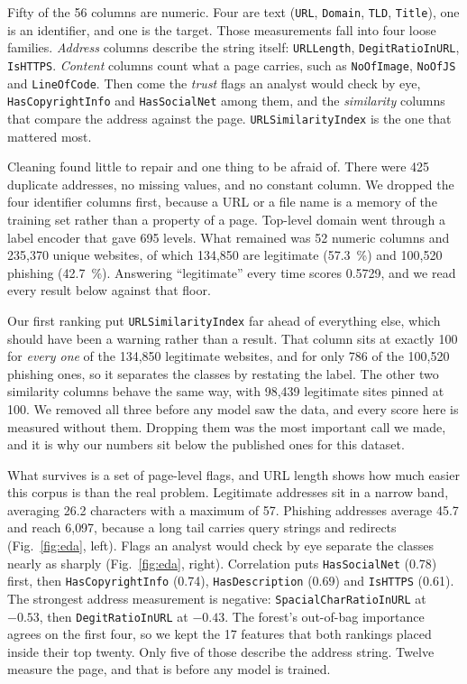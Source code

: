 \documentclass[11pt,journal,a4paper]{IEEEtran}
\begin{document}
Fifty of the 56 columns are numeric. Four are text (\texttt{URL}, \texttt{Domain}, \texttt{TLD},
\texttt{Title}), one is an identifier, and one is the target. Those measurements fall into four loose families.
\emph{Address} columns describe the string itself: \texttt{URLLength}, \texttt{DegitRatioInURL},
\texttt{IsHTTPS}. \emph{Content} columns count what a page carries, such as \texttt{NoOfImage}, \texttt{NoOfJS}
and \texttt{LineOfCode}. Then come the \emph{trust} flags an analyst would check by eye, \texttt{HasCopyrightInfo}
and \texttt{HasSocialNet} among them, and the \emph{similarity} columns that compare the address against the
page. \texttt{URLSimilarityIndex} is the one that mattered most.

Cleaning found little to repair and one thing to be afraid of. There were 425 duplicate addresses, no missing
values, and no constant column. We dropped the four identifier columns first, because a URL or a file name is a
memory of the training set rather than a property of a page. Top-level domain went through a label encoder that gave 695 levels.
What remained was 52 numeric columns and 235{,}370 unique websites, of which 134{,}850 are legitimate (57.3~\%)
and 100{,}520 phishing (42.7~\%). Answering ``legitimate'' every time scores 0.5729, and we read every result
below against that floor.

Our first ranking put \texttt{URLSimilarityIndex} far ahead of everything else, which should have been a warning
rather than a result. That column sits at exactly 100 for \emph{every one} of the 134{,}850 legitimate websites,
and for only 786 of the 100{,}520 phishing ones, so it separates the classes by restating the label. The other two
similarity columns behave the same way, with 98{,}439 legitimate sites pinned at 100. We removed all three before
any model saw the data, and every score here is measured without them. Dropping them was the most important call we made,
and it is why our numbers sit below the published ones for this dataset.

What survives is a set of page-level flags, and URL length shows how much easier this corpus is than the real
problem. Legitimate addresses sit in a narrow band, averaging 26.2 characters with a maximum of 57. Phishing
addresses average 45.7 and reach 6{,}097, because a long tail carries query strings and redirects
(Fig.~\ref{fig:eda}, left). Flags an analyst would check by eye separate the classes nearly as sharply
(Fig.~\ref{fig:eda}, right).
Correlation puts \texttt{HasSocialNet} (0.78) first, then \texttt{HasCopyrightInfo} (0.74),
\texttt{HasDescription} (0.69) and \texttt{IsHTTPS} (0.61). The strongest address measurement is negative:
\texttt{SpacialCharRatioInURL} at $-0.53$, then \texttt{DegitRatioInURL} at $-0.43$. The forest's out-of-bag
importance agrees on the first four, so we kept the 17 features that both rankings placed inside their top twenty.
Only five of those describe the address string. Twelve measure the page, and that is before any model is trained.
\end{document}
